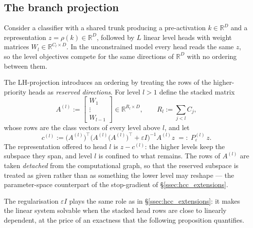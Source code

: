 \subsection{The branch projection}
\label{ssec:lhproj_construction}

Consider a classifier with a shared trunk producing a pre-activation
$k\in\mathbb{R}^{D}$ and a representation $z=\rho(k)\in\mathbb{R}^{D}$, followed by
$L$ linear level heads with weight matrices $W_l\in\mathbb{R}^{C_l\times D}$. In
the unconstrained model every head reads the same $z$, so the level objectives
compete for the same directions of $\mathbb{R}^{D}$ with no ordering between them.

The LH-projection introduces an ordering by treating the rows of the
higher-priority heads as \emph{reserved directions}. For level $l>1$ define the
stacked matrix
\[
A^{(l)}
:=
\begin{bmatrix} W_1\\ \vdots\\ W_{l-1}\end{bmatrix}
\in\mathbb{R}^{R_l\times D},
\qquad
R_l:=\sum_{j<l}C_j ,
\]
whose rows are the class vectors of every level above $l$, and let
\[
c^{(l)}
:=
\big(A^{(l)}\big)^{\!\top}
\Big(A^{(l)}\big(A^{(l)}\big)^{\!\top}+\varepsilon I\Big)^{-1}
A^{(l)} z
\;=:\;
P^{(l)}_\varepsilon\, z .
\]
The representation offered to head $l$ is $z-c^{(l)}$: the higher levels keep the
subspace they span, and level $l$ is confined to what remains. The rows of
$A^{(l)}$ are taken \emph{detached} from the computational graph, so that the
reserved subspace is treated as given rather than as something the lower level may
reshape --- the parameter-space counterpart of the stop-gradient of
\S\ref{ssec:hcc_extensions}.

The regularisation $\varepsilon I$ plays the same role as in
\S\ref{ssec:hcc_extensions}: it makes the linear system solvable when the stacked
head rows are close to linearly dependent, at the price of an exactness that the
following proposition quantifies.

